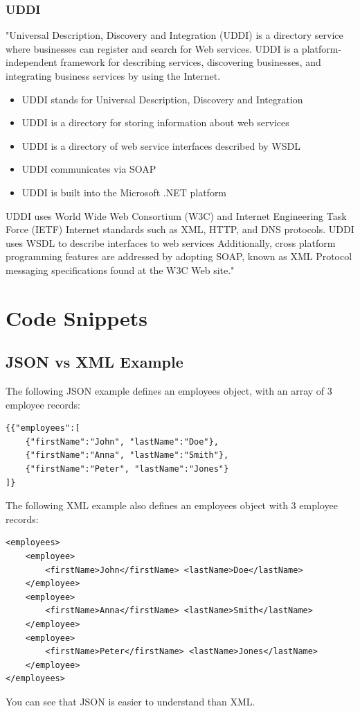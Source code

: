 \documentclass[12pt]{article}
\begin{document}
\subsubsection{UDDI}
"Universal Description, Discovery and Integration (UDDI) is a directory service where businesses can register and search for Web services.
UDDI is a platform-independent framework for describing services, discovering businesses, and integrating business services by using the Internet.\\
\begin{itemize}
\item UDDI stands for Universal Description, Discovery and Integration
\item UDDI is a directory for storing information about web services
\item UDDI is a directory of web service interfaces described by WSDL
\item UDDI communicates via SOAP
\item UDDI is built into the Microsoft .NET platform
\end{itemize}
UDDI uses World Wide Web Consortium (W3C) and Internet Engineering Task Force (IETF) Internet standards such as XML, HTTP, and DNS protocols.
UDDI uses WSDL to describe interfaces to web services Additionally, cross platform programming features are addressed by adopting SOAP, known as XML Protocol messaging specifications found at the W3C Web site."\cite{uddi}
\section{Code Snippets}
\subsection{JSON vs XML Example}
The following JSON example defines an employees object, with an array of 3 employee records:
\begin{lstlisting}
{{"employees":[
    {"firstName":"John", "lastName":"Doe"}, 
    {"firstName":"Anna", "lastName":"Smith"},
    {"firstName":"Peter", "lastName":"Jones"}
]}
\end{lstlisting}
The following XML example also defines an employees object with 3 employee records:
\begin{lstlisting}
<employees>
    <employee>
        <firstName>John</firstName> <lastName>Doe</lastName>
    </employee>
    <employee>
        <firstName>Anna</firstName> <lastName>Smith</lastName>
    </employee>
    <employee>
        <firstName>Peter</firstName> <lastName>Jones</lastName>
    </employee>
</employees>
\end{lstlisting}
You can see that JSON is easier to understand than XML.\cite{jsonxml}
\end{document}
